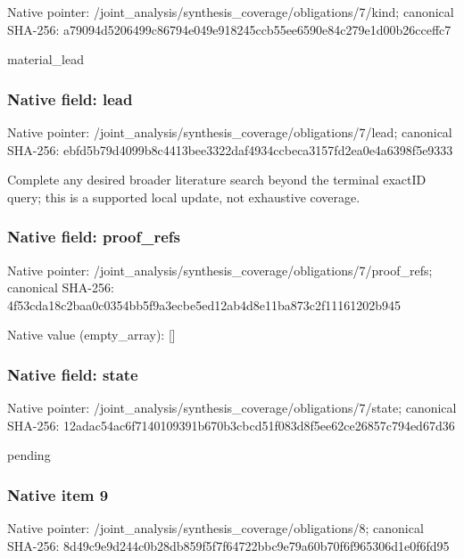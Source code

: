 \documentclass[10pt,a4paper]{article}
\begin{document}
Native pointer: /joint\_analysis/synthesi\allowbreak{}s\_coverage/obligations/7\allowbreak{}/kind; canonical SHA-256: a79094d5206499c86794e049\allowbreak{}e918245ccb55ee6590e84c27\allowbreak{}9e1d00b26cceffc7


material\_lead


\subsubsection{Native field: lead}


Native pointer: /joint\_analysis/synthesi\allowbreak{}s\_coverage/obligations/7\allowbreak{}/lead; canonical SHA-256: ebfd5b79d4099b8c4413bee3\allowbreak{}322daf4934ccbeca3157fd2e\allowbreak{}a0e4a6398f5e9333


Complete any desired broader literature search beyond the terminal exactID query; this is a supported local update, not exhaustive coverage.


\subsubsection{Native field: proof\_refs}


Native pointer: /joint\_analysis/synthesi\allowbreak{}s\_coverage/obligations/7\allowbreak{}/proof\_refs; canonical SHA-256: 4f53cda18c2baa0c0354bb5f\allowbreak{}9a3ecbe5ed12ab4d8e11ba87\allowbreak{}3c2f11161202b945



Native value (empty\_array): []



\subsubsection{Native field: state}


Native pointer: /joint\_analysis/synthesi\allowbreak{}s\_coverage/obligations/7\allowbreak{}/state; canonical SHA-256: 12adac54ac6f7140109391b6\allowbreak{}70b3cbcd51f083d8f5ee62ce\allowbreak{}26857c794ed67d36


pending


\subsubsection{Native item 9}


Native pointer: /joint\_analysis/synthesi\allowbreak{}s\_coverage/obligations/8; canonical SHA-256: 8d49c9e9d244c0b28db859f5\allowbreak{}f7f64722bbc9e79a60b70f6f\allowbreak{}965306d1e0f6fd95
\end{document}
